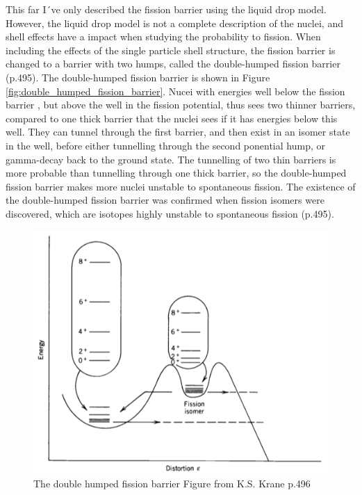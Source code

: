 \documentclass[]{article}
\begin{document}
\par
\vspace{3mm}

\noindent This far I´ve only described the fission barrier using the liquid drop model. However, the liquid drop model is not a complete description of the nuclei, and shell effects have a impact when studying the probability to fission. When including the effects of the single particle shell structure, the fission barrier is changed to a barrier with two humps, called the double-humped fission barrier \cite{Krane1988} (p.495). The double-humped fission barrier is shown in Figure \ref{fig:double_humped_fission_barrier}. Nucei with energies well below the fission barrier , but above the well in the fission potential, thus sees two thinner barriers, compared to one thick barrier that the nuclei sees if it has energies below this well. They can tunnel through the first barrier, and then exist in an isomer state in the well, before either tunnelling through the second ponential hump, or gamma-decay back to the ground state.  The tunnelling of two thin barriers is more probable than tunnelling through one thick barrier, so the double-humped fission barrier makes more nuclei unstable to spontaneous fission. The existence of the double-humped fission barrier was confirmed when fission isomers were discovered, which are isotopes highly unstable to spontaneous fission \cite{Krane1988} (p.495). 

  \begin{figure}
 	\centering
 	\includegraphics[scale=0.7]{double_humped_fission_barrier.png}
 	\caption{The double humped fission barrier Figure from K.S. Krane p.496 \cite{Krane1988}}
 	\label{fig:smooth_fission_barrier}
 \end{figure}
\end{document}
